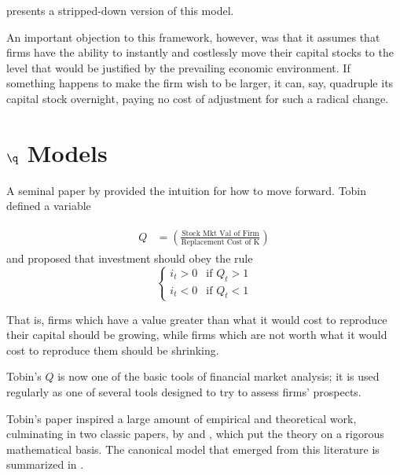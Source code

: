 \documentclass{handout}
\begin{document}
 presents a stripped-down version of this model.  

An important objection to this framework, however, was that it assumes that firms have the ability
to instantly and costlessly move their capital stocks to the level that would be justified by the
prevailing economic environment.  If something happens to make the firm wish to be larger, it can,
say, quadruple its capital stock overnight, paying no cost of adjustment for such a radical change.

\section{$\q$ Models}

A seminal paper by \cite{tobinsQ} provided the intuition for how to move forward.  Tobin defined
a variable

\begin{equation}\begin{gathered}\begin{aligned}
Q & =  \left(\frac{\text{Stock Mkt Val of Firm}}{\text{Replacement Cost of K}}\right)
\end{aligned}\end{gathered}\end{equation}
and proposed that investment should obey the rule
\begin{equation}
  \label{eq:1}
  \begin{cases}
   i_{t} > 0 & \text{if $Q_{t} > 1$}
\\ i_{t} < 0 & \text{if $Q_{t} < 1$}
\end{cases}
\end{equation}

That is, firms which have a value greater than what it would cost to reproduce
their capital should be growing, while firms which are not worth what it would cost
to reproduce them should be shrinking.

Tobin's $Q$ is now one of the basic tools of financial market analysis; it is used regularly
as one of several tools designed to try to assess firms' prospects.

Tobin's paper inspired a large amount of empirical and theoretical work, 
culminating in two classic papers, by \cite{abel:q} and \cite{hayashi:q},
which put the theory on a rigorous mathematical basis.  The canonical
model that emerged from this literature is summarized in .
\end{document}
